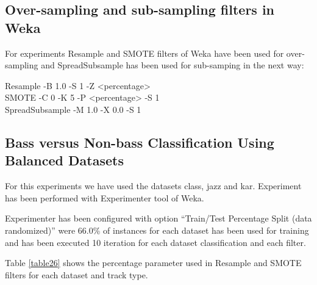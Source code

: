 \documentclass{article}
\begin{document}
\subsection{Over-sampling and sub-sampling filters in Weka}

For experiments Resample and SMOTE filters of Weka have been used for over-sampling and SpreadSubsample has been used for sub-samping in the next way:

Resample -B 1.0 -S 1 -Z <percentage> \\
SMOTE -C 0 -K 5 -P <percentage> -S 1 \\
SpreadSubsample  -M 1.0  -X 0.0 -S 1 \\





\subsection{Bass versus Non-bass Classification Using Balanced Datasets}

For this experiments we have used the datasets class, jazz and kar. Experiment has been performed with Experimenter tool of Weka. 

Experimenter has been configured with option “Train/Test Percentage Split (data randomized)” were 66.0\% of instances for each dataset has been used for training and has been executed 10 iteration for each dataset classification and each filter.

Table \ref{table26} shows the percentage parameter used in Resample and SMOTE filters for each dataset and track type.
\end{document}

